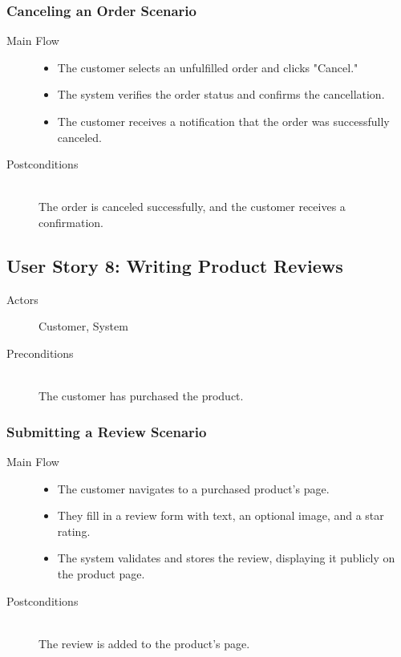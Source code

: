 \documentclass[a4paper,journal]{IEEEtran}
\begin{document}
\subsubsection{Canceling an Order Scenario}
\begin{description}
  \item[Main Flow] \hfill
    \begin{itemize}
      \item The customer selects an unfulfilled order and clicks "Cancel."
      \item The system verifies the order status and confirms the cancellation.
      \item The customer receives a notification that the order was successfully
        canceled.
    \end{itemize}
  \item[Postconditions] \hfill \\
    The order is canceled successfully, and the customer receives a
    confirmation.
\end{description}

\subsection{User Story 8: Writing Product Reviews}
\begin{description}
  \item[Actors] Customer, System
  \item[Preconditions] \hfill \\ The customer has purchased the product.
\end{description}
\subsubsection{Submitting a Review Scenario}
\begin{description}
  \item[Main Flow] \hfill
    \begin{itemize}
      \item The customer navigates to a purchased product's page.
      \item They fill in a review form with text, an optional image, and a star
        rating.
      \item The system validates and stores the review, displaying it publicly
        on the product page.
    \end{itemize}
  \item[Postconditions] \hfill \\
    The review is added to the product's page.
\end{description}
\end{document}
